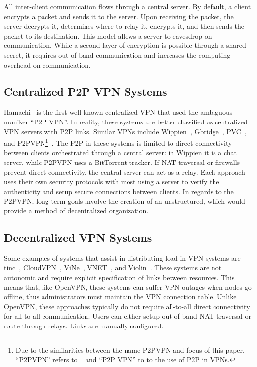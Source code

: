All inter-client communication flows through a central server.  By default, a
client encrypts a packet and sends it to the server.  Upon receiving the
packet, the server decrypts it, determines where to relay it, encrypts it, and
then sends the packet to its destination.  This model allows a server to
eavesdrop on communication.  While a second layer of encryption is possible
through a shared secret, it requires out-of-band communication and increases
the computing overhead on communication.


\subsection{Centralized P2P VPN Systems}

Hamachi~\cite{hamachi} is the first well-known centralized VPN that used the
ambiguous moniker ``P2P VPN''.  In reality, these systems are better classified
as centralized VPN servers with P2P links.  Similar VPNs include
Wippien~\cite{wippien}, Gbridge~\cite{gbridge}, PVC~\cite{pvc}, and
P2PVPN\footnote{Due to the similarities between the name P2PVPN and focus of
this paper, ``P2PVPN'' refers to ~\cite{p2pvpn} and ``P2P VPN'' to to the use
of P2P in VPNs.}~\cite{p2pvpn}.  The P2P in these systems is limited to direct
connectivity between clients orchestrated through a central server: in Wippien
it is a chat server, while P2PVPN uses a BitTorrent tracker.  If NAT traversal
or firewalls prevent direct connectivity, the central server can act as a
relay.  Each approach uses their own security protocols with most using a
server to verify the authenticity and setup secure connections between clients.
In regards to the P2PVPN, long term goals involve the creation of an
unstructured, which would provide a method of decentralized organization.

\subsection{Decentralized VPN Systems}
Some examples of systems that assist in distributing load in VPN systems are
tinc~\cite{tinc}, CloudVPN~\cite{cloudvpn}, ViNe~\cite{vine}, VNET~\cite{vnet},
and Violin~\cite{violin}.  These systems are not autonomic and require explicit
specification of links between resources.  This means that, like OpenVPN, these
systems can suffer VPN outages when nodes go offline, thus administrators must
maintain the VPN connection table.  Unlike OpenVPN, these approaches typically
do not require all-to-all direct connectivity for all-to-all communication.
Users can either setup out-of-band NAT traversal or route through relays.  Links
are manually configured.


